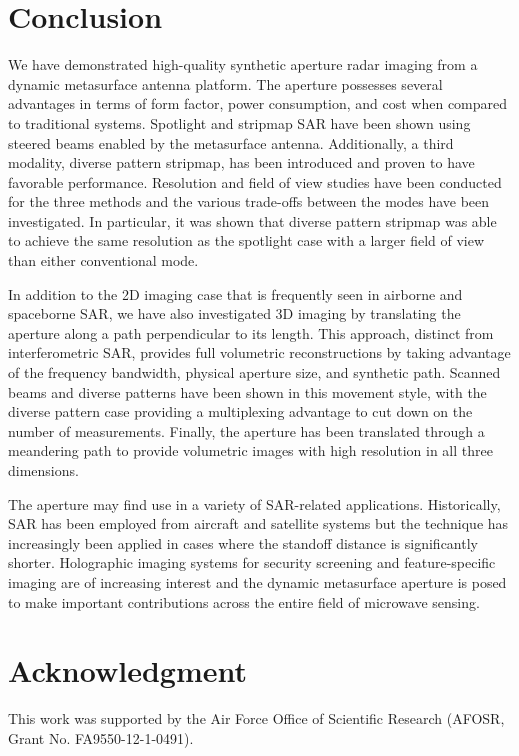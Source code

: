 \documentclass[journal]{IEEEtran}
\begin{document}
\section{Conclusion}
\label{sec:sec6}

We have demonstrated high-quality synthetic aperture radar imaging from a dynamic metasurface antenna platform. The aperture possesses several advantages in terms of form factor, power consumption, and cost when compared to traditional systems. Spotlight and stripmap SAR have been shown using steered beams enabled by the metasurface antenna. Additionally, a third modality, diverse pattern stripmap, has been introduced and proven to have favorable performance. Resolution and field of view studies have been conducted for the three methods and the various trade-offs between the modes have been investigated. In particular, it was shown that diverse pattern stripmap was able to achieve the same resolution as the spotlight case with a larger field of view than either conventional mode.

In addition to the 2D imaging case that is frequently seen in airborne and spaceborne SAR, we have also investigated 3D imaging by translating the aperture along a path perpendicular to its length. This approach, distinct from interferometric SAR, provides full volumetric reconstructions by taking advantage of the frequency bandwidth, physical aperture size, and synthetic path. Scanned beams and diverse patterns have been shown in this movement style, with the diverse pattern case providing a multiplexing advantage to cut down on the number of measurements. Finally, the aperture has been translated through a meandering path to provide volumetric images with high resolution in all three dimensions.

The aperture may find use in a variety of SAR-related applications. Historically, SAR has been employed from aircraft and satellite systems but the technique has increasingly been applied in cases where the standoff distance is significantly shorter. Holographic imaging systems \cite{nikolovaMicrowaveHolo,brady2009CSholo} for security screening \cite{sleasmanMarathon,hunt2014metaimager,sheen2001threatimaging,alvarez2015_3dCS,yarovoySparseSAR} and feature-specific imaging \cite{neifeld2003featspecimag,gehmFeatSpecific} are of increasing interest and the dynamic metasurface aperture is posed to make important contributions across the entire field of microwave sensing.



\section*{Acknowledgment}
This work was supported by the Air Force Office of Scientific Research (AFOSR, Grant No. FA9550-12-1-0491).



\end{document}
